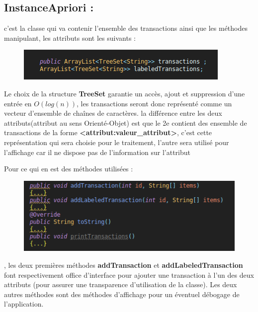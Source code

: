 			\subsection{InstanceApriori : } c'est la classe qui va contenir l'ensemble des transactions ainsi que les méthodes manipulant, les attributs sont les suivants : \\
			\begin{figure}[H]
				\centering
				\includegraphics[width=0.75\linewidth]{apriori/images/data_structs/instance/properties.png}
			\end{figure}
			\par 
			Le choix de la structure \textbf{TreeSet} garantie un accès, ajout et suppression d'une entrée en $O(log(n))$, les transactions seront donc représenté comme un vecteur d'ensemble de chaînes de caractères. la différence entre les deux attributs(attribut au sens Orienté-Objet) est que le 2e contient des ensemble de transactions de la forme \textbf{<attribut:valeur\_attribut>}, c'est cette représentation qui sera choisie pour le traitement, l'autre sera utilisé pour l'affichage car il ne dispose pas de l'information sur l'attribut
			\par Pour ce qui en est des méthodes utilisées : 
			\begin{figure}[H]
				\centering
				\includegraphics[width=0.75\linewidth]{apriori/images/data_structs/instance/methods.png}
			\end{figure}
			\par, les deux premières méthodes \textbf{addTransaction} et \textbf{addLabeledTransaction} font respectivement office d'interface pour ajouter une transaction à l'un des deux attributs (pour assurer une transparence d'utilisation de la classe). Les deux autres méthodes sont des méthodes d'affichage pour un éventuel débogage de l'application.
			
